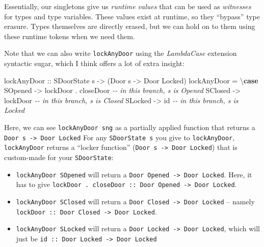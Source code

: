 \documentclass[]{article}
\newenvironment{Shaded}{}{}
\newcommand{\CommentTok}[1]{\textcolor[rgb]{0.38,0.63,0.69}{\textit{#1}}}
\newcommand{\DataTypeTok}[1]{\textcolor[rgb]{0.56,0.13,0.00}{#1}}
\newcommand{\FunctionTok}[1]{\textcolor[rgb]{0.02,0.16,0.49}{#1}}
\newcommand{\KeywordTok}[1]{\textcolor[rgb]{0.00,0.44,0.13}{\textbf{#1}}}
\newcommand{\NormalTok}[1]{#1}
\newcommand{\OperatorTok}[1]{\textcolor[rgb]{0.40,0.40,0.40}{#1}}
\newcommand{\OtherTok}[1]{\textcolor[rgb]{0.00,0.44,0.13}{#1}}
\begin{document}
Essentially, our singletons give us \emph{runtime values} that can be used as
\emph{witnesses} for types and type variables. These values exist at runtime, so
they ``bypass'' type erasure. Types themselves are directly erased, but we can
hold on to them using these runtime tokens when we need them.

Note that we can also write \texttt{lockAnyDoor} using the \emph{LambdaCase}
extension syntactic sugar, which I think offers a lot of extra insight:

\begin{Shaded}
\begin{Highlighting}[]
\OtherTok{lockAnyDoor ::} \DataTypeTok{SDoorState}\NormalTok{ s }\OtherTok{{-}\textgreater{}}\NormalTok{ (}\DataTypeTok{Door}\NormalTok{ s }\OtherTok{{-}\textgreater{}} \DataTypeTok{Door} \DataTypeTok{\textquotesingle{}Locked}\NormalTok{)}
\NormalTok{lockAnyDoor }\OtherTok{=}\NormalTok{ \textbackslash{}}\KeywordTok{case}
    \DataTypeTok{SOpened} \OtherTok{{-}\textgreater{}}\NormalTok{ lockDoor }\OperatorTok{.}\NormalTok{ closeDoor  }\CommentTok{{-}{-} in this branch, s is \textquotesingle{}Opened}
    \DataTypeTok{SClosed} \OtherTok{{-}\textgreater{}}\NormalTok{ lockDoor              }\CommentTok{{-}{-} in this branch, s is \textquotesingle{}Closed}
    \DataTypeTok{SLocked} \OtherTok{{-}\textgreater{}} \FunctionTok{id}                    \CommentTok{{-}{-} in this branch, s is \textquotesingle{}Locked}
\end{Highlighting}
\end{Shaded}

Here, we can see \texttt{lockAnyDoor\ sng} as a partially applied function that
returns a \texttt{Door\ s\ -\textgreater{}\ Door\ \textquotesingle{}Locked} For
any \texttt{SDoorState\ s} you give to \texttt{lockAnyDoor},
\texttt{lockAnyDoor} returns a ``locker function''
(\texttt{Door\ s\ -\textgreater{}\ Door\ \textquotesingle{}Locked}) that is
custom-made for your \texttt{SDoorState}:

\begin{itemize}
\item
  \texttt{lockAnyDoor\ SOpened} will return a
  \texttt{Door\ \textquotesingle{}Opened\ -\textgreater{}\ Door\ \textquotesingle{}Locked}.
  Here, it has to give
  \texttt{lockDoor\ .\ closeDoor\ ::\ Door\ \textquotesingle{}Opened\ -\textgreater{}\ Door\ \textquotesingle{}Locked}.
\item
  \texttt{lockAnyDoor\ SClosed} will return a
  \texttt{Door\ \textquotesingle{}Closed\ -\textgreater{}\ Door\ \textquotesingle{}Locked}
  -- namely
  \texttt{lockDoor\ ::\ Door\ \textquotesingle{}Closed\ -\textgreater{}\ Door\ \textquotesingle{}Locked}.
\item
  \texttt{lockAnyDoor\ SLocked} will return a
  \texttt{Door\ \textquotesingle{}Locked\ -\textgreater{}\ Door\ \textquotesingle{}Locked},
  which will just be
  \texttt{id\ ::\ Door\ \textquotesingle{}Locked\ -\textgreater{}\ Door\ \textquotesingle{}Locked}
\end{itemize}
\end{document}

